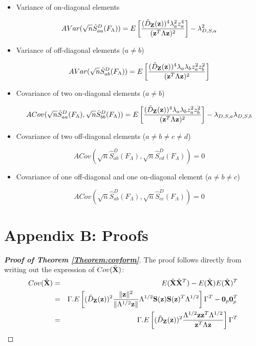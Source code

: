 \documentclass[fleqn,11pt]{article}
\begin{document}
\begin{itemize}
\item Variance of on-diagonal elements

$$ AVar( \sqrt n \hat S^D_{aa} (F_\Lambda)) = E \left[ \frac{(\tilde D_{\mathbf{Z}} ({\bf{z}}))^4 \lambda_a^2 z_a^4}{({\bf{z}}^T \Lambda {\bf{z}})^2} \right] - \lambda_{D,S,a}^2 $$

\item Variance of off-diagonal elements ($a \neq b$)

$$ AVar( \sqrt n \hat S^D_{ab} (F_\Lambda)) = E \left[ \frac{(\tilde D_{\mathbf{Z}} ({\bf{z}}))^4 \lambda_a \lambda_b z_a^2 z_b^2}{({\bf{z}}^T \Lambda {\bf{z}})^2} \right] $$

\item Covariance of two on-diagonal elements ($a \neq b$)

$$ ACov(\sqrt n \hat S^D_{aa} (F_\Lambda), \sqrt n \hat S^D_{bb} (F_\Lambda))
= E \left[ \frac{(\tilde D_{\mathbf{Z}} ({\bf{z}}))^4 \lambda_a \lambda_b z_a^2 z_b^2}{({\bf{z}}^T \Lambda {\bf{z}})^2} \right] - \lambda_{D,S,a} \lambda_{D,S,b} $$

\item Covariance of two off-diagonal elements ($a \neq b \neq c \neq d$)

$$ ACov(\sqrt n \hat S^D_{ab} (F_\Lambda), \sqrt n \hat S^D_{cd} (F_\Lambda)) = 0 $$

\item Covariance of one off-diagonal and one on-diagonal element ($a \neq b \neq c$)

$$ ACov(\sqrt n \hat S^D_{ab} (F_\Lambda), \sqrt n \hat S^D_{cc} (F_\Lambda)) = 0 $$
\end{itemize}

\section*{Appendix B: Proofs}
\begin{proof}[\textbf{Proof of Theorem  \ref{Theorem:covform}}]
The proof follows directly from writing out the expression of $Cov ( \tilde {{\mathbf{X}}})$:
\begin{eqnarray*}
Cov(\tilde{{\mathbf{X}}}) &=& E(\tilde{{\mathbf{X}}} \tilde{{\mathbf{X}}}^T) - E(\tilde{{\mathbf{X}}}) E(\tilde{{\mathbf{X}}})^T\\
&=& \Gamma . E \left[ (\tilde D_{\mathbf{Z}}({\bf{z}}))^2 \frac{\|{\bf{z}}\|^2}{\| \Lambda^{1/2}{\bf{z}}\|} \Lambda^{1/2} {\mathbf{S}}({\bf{z}}) {\mathbf{S}}({\bf{z}})^T \Lambda^{1/2} \right] \Gamma^T - {\bf 0}_p {\bf 0}_p^T\\
&=& \Gamma .E \left[ (\tilde D_{\mathbf{Z}}({\bf{z}}))^2 \frac{\Lambda^{1/2} {\bf{z}} {\bf{z}}^T \Lambda^{1/2}}{{\bf{z}}^T \Lambda {\bf{z}}} \right] \Gamma^T
\end{eqnarray*}


\end{proof}
\end{document}
